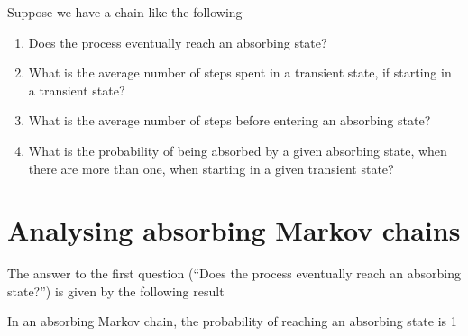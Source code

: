 \documentclass[aspectratio=169]{beamer}\usepackage[]{graphicx}\usepackage[]{xcolor}
\begin{document}
\begin{frame}
Suppose we have a chain like the following
\begin{center}
\end{center}
\vfill
\begin{enumerate}
\item Does the process eventually reach an absorbing state?
\item What is the average number of steps spent in a transient state, if starting in a transient state?
\item What is the average number of steps before entering an absorbing state?
\item What is the probability of being absorbed by a given absorbing state, when there are more than one, when starting in a given transient state?
\end{enumerate}
\end{frame}

\section{Analysing absorbing Markov chains}

\begin{frame}
The answer to the first question (``Does the process eventually reach an absorbing state?'') is given by the following result
\vfill
\begin{theorem}
In an absorbing Markov chain, the probability of reaching an absorbing state is 1
\end{theorem}
\end{frame}
\end{document}
